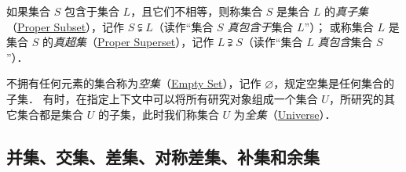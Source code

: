 如果集合 $S$ 包含于集合 $L$，且它们不相等，则称集合 $S$ 是集合 $L$ 的\emph{真子集}（\href{http://mathworld.wolfram.com/ProperSubset.html}{Proper Subset}），记作 $S\subsetneqq{}L$（读作``集合 $S$ \emph{真包含于}集合 $L$''）；
或称集合 $L$ 是集合 $S$ 的\emph{真超集}（\href{http://mathworld.wolfram.com/ProperSuperset.html}{Proper Superset}），记作 $L\supsetneqq{}S$（读作``集合 $L$ \emph{真包含}集合 $S$''）．

不拥有任何元素的集合称为\emph{空集}（\href{http://mathworld.wolfram.com/EmptySet.html}{Empty Set}），记作 $\varnothing$，规定空集是任何集合的子集．
有时，在指定上下文中可以将所有研究对象组成一个集合 $U$，所研究的其它集合都是集合 $U$ 的子集，此时我们称集合 $U$ 为\emph{全集}（\href{http://mathworld.wolfram.com/UniversalSet.html}{Universe}）．

\subsection{并集、交集、差集、对称差集、补集和余集}

